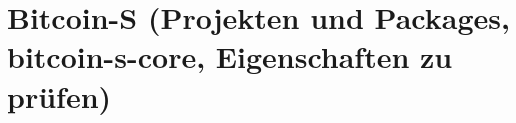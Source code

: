 

\section{Bitcoin-S (Projekten und Packages, bitcoin-s-core, Eigenschaften zu prüfen)}
\label{sec:bitcoin_s}



